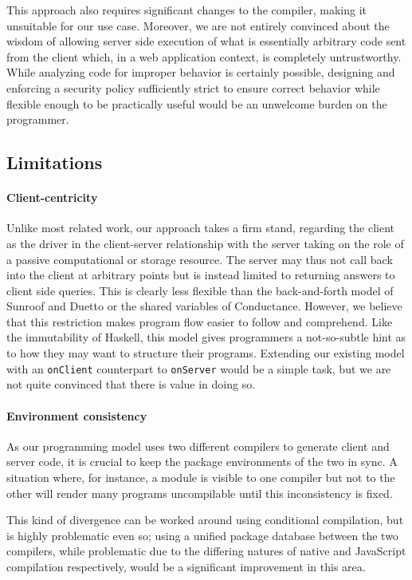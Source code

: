 \documentclass[preprint]{sigplanconf}
\begin{document}
This approach also requires significant changes to the compiler, making it
unsuitable for our use case. Moreover, we are not entirely convinced about the
wisdom of allowing server side execution of what is essentially arbitrary code
sent from the client which, in a web application context, is completely
untrustworthy. While analyzing code for improper behavior is certainly
possible, designing and enforcing a security policy sufficiently strict to
ensure correct behavior while flexible enough to be practically useful would be
an unwelcome burden on the programmer.

\subsection{Limitations}
\label{sec:limitations}

\paragraph{Client-centricity} Unlike most related work, our approach
takes a firm stand, regarding the client as the driver in the client-server
relationship with the server taking on the role of a passive computational
or storage resource. The server may thus not call back into the client at
arbitrary points but is instead limited to returning answers to client side
queries. This is clearly less flexible than the back-and-forth model of Sunroof
and Duetto or the shared variables of Conductance. However, we believe that
this restriction makes program flow easier to follow and comprehend. Like the
immutability of Haskell, this model gives programmers a not-so-subtle hint
as to how they may want to structure their programs. Extending our existing
model with an \lstinline!onClient! counterpart to \lstinline!onServer! would be
a simple task, but we are not quite convinced that there is value in doing so.

\paragraph{Environment consistency} As our programming model uses two different
compilers to generate client and server code, it is crucial to keep the package
environments of the two in sync. A situation where, for instance, a module is
visible to one compiler but not to the other will render many programs
uncompilable until this inconsistency is fixed.

This kind of divergence can be worked around using conditional compilation, but
is highly problematic even so; using a unified package database between the two
compilers, while problematic due to the differing natures of native and
JavaScript compilation respectively, would be a significant improvement in this
area.
\end{document}
